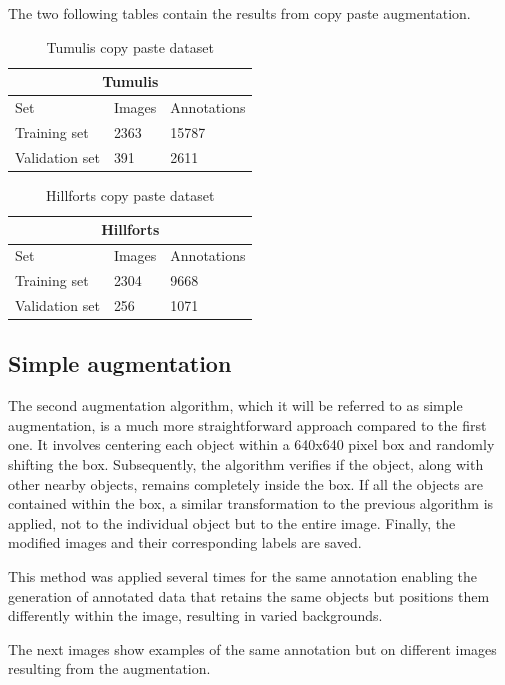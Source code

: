 The two following tables contain the results from copy paste augmentation.

\begin{table}[H]
\centering
\begin{tabular}{|p{3cm}|p{2.5cm}|p{2cm}|} 
\hline
\multicolumn{3}{|c|}{Tumulis} \\
 \hline
  Set & Images & Annotations\\ [0.5ex] 
 \hline
 Training set & 2363 & 15787 \\ 
 Validation set & 391 & 2611  \\[1ex]
 \hline
\end{tabular}
\caption{Tumulis copy paste dataset}
\end{table} 

\begin{table}[H]
\centering
\begin{tabular}{|p{3cm}|p{2.5cm}|p{2cm}|} 
\hline
\multicolumn{3}{|c|}{Hillforts} \\
 \hline
  Set & Images & Annotations\\ [0.5ex] 
 \hline
 Training set & 2304 & 9668 \\ 
 Validation set & 256 & 1071  \\[1ex]
 \hline
\end{tabular}
\caption{Hillforts copy paste dataset}
\end{table} 


\subsection{Simple augmentation}
The second augmentation algorithm,  which it will be referred to as simple augmentation, is a much more straightforward approach compared to the first one. It involves centering each object within a 640x640 pixel box and randomly shifting the box. Subsequently, the algorithm verifies if the object, along with other nearby objects, remains completely inside the box. If all the objects are contained within the box, a similar transformation to the previous algorithm is applied, not to the individual object but to the entire image. Finally, the modified images and their corresponding labels are saved.

This method was applied several times for the same annotation enabling the generation of annotated data that retains the same objects but positions them differently within the image, resulting in varied backgrounds.

The next images show examples of the same annotation but on different images resulting from the augmentation.

